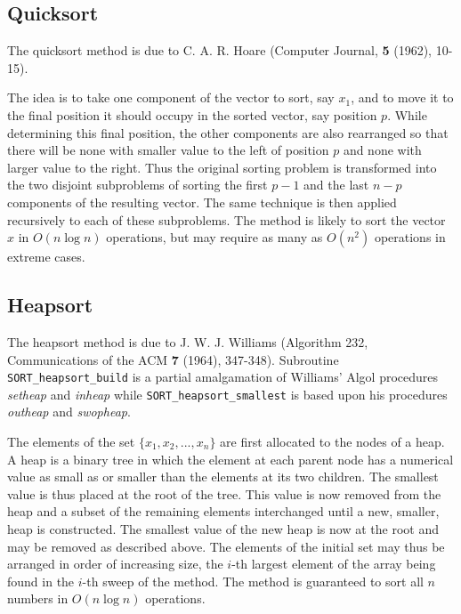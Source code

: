 \documentclass{galahad}
\newcommand{\packagename}{SORT}
\begin{document}

\galmethod

\subsection{Quicksort}

The quicksort method is due to C. A. R. Hoare (Computer Journal, {\bf 5 }
(1962), 10-15).

\noindent
The idea is to take one component of the vector to sort, say $x_1$, and to
move it to the final position it should occupy in the sorted vector, say
position $p$. While determining this final position, the other components are
also rearranged so that there will be none with smaller value to the left of
position $p$ and none with larger value to the right. Thus the original
sorting problem is transformed into the two disjoint subproblems of sorting the
first $p-1$ and the last $n-p$ components of the resulting vector. The same
technique is then applied recursively to each of these subproblems.
The method is likely to sort the vector $x$ in $O( n \log n )$ operations,
but may require as many as $O( n^2 )$ operations in extreme cases.

\subsection{Heapsort}

The heapsort method is due to J. W. J.  Williams (Algorithm 232,
Communications of the ACM
{\bf 7 } (1964), 347-348).  Subroutine {\tt \packagename\_heapsort\_build}
is a partial amalgamation of Williams' Algol procedures {\em setheap}
and {\em inheap} while {\tt \packagename\_heapsort\_smallest}
is based upon his procedures {\em outheap} and {\em swopheap}.

\noindent
The elements of the set $\{ x_1 ,   x_2 ,  ...  ,  x_n \}$
are first allocated to the nodes of a heap.  A heap is a binary
tree in which the element at each parent node has a numerical
value as small as or smaller than the elements at its two children.
The smallest value is
thus placed at the root of the tree. This value is now removed from
the heap and a subset of the remaining elements interchanged until a
new, smaller, heap is constructed.  The smallest value of the new heap
is now at the root and may be removed as described above. The elements
of the initial set may thus be arranged in order of increasing size,
the $i$-th largest element of the array being found in the $i$-th
sweep of the method.  The method is guaranteed to sort all $n$ numbers
in $O( n \log n )$ operations.
\end{document}
